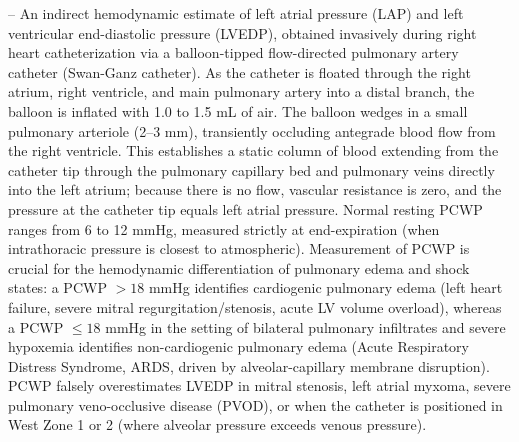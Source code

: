 -- An indirect hemodynamic estimate of left atrial pressure (LAP) and left ventricular end-diastolic pressure (LVEDP), obtained invasively during right heart catheterization via a balloon-tipped flow-directed pulmonary artery catheter (Swan-Ganz catheter). As the catheter is floated through the right atrium, right ventricle, and main pulmonary artery into a distal branch, the balloon is inflated with 1.0 to 1.5 mL of air. The balloon wedges in a small pulmonary arteriole (2--3 mm), transiently occluding antegrade blood flow from the right ventricle. This establishes a static column of blood extending from the catheter tip through the pulmonary capillary bed and pulmonary veins directly into the left atrium; because there is no flow, vascular resistance is zero, and the pressure at the catheter tip equals left atrial pressure. Normal resting PCWP ranges from 6 to 12 mmHg, measured strictly at end-expiration (when intrathoracic pressure is closest to atmospheric). Measurement of PCWP is crucial for the hemodynamic differentiation of pulmonary edema and shock states: a PCWP $>18$ mmHg identifies cardiogenic pulmonary edema (left heart failure, severe mitral regurgitation/stenosis, acute LV volume overload), whereas a PCWP $\le 18$ mmHg in the setting of bilateral pulmonary infiltrates and severe hypoxemia identifies non-cardiogenic pulmonary edema (Acute Respiratory Distress Syndrome, ARDS, driven by alveolar-capillary membrane disruption). PCWP falsely overestimates LVEDP in mitral stenosis, left atrial myxoma, severe pulmonary veno-occlusive disease (PVOD), or when the catheter is positioned in West Zone 1 or 2 (where alveolar pressure exceeds venous pressure).

